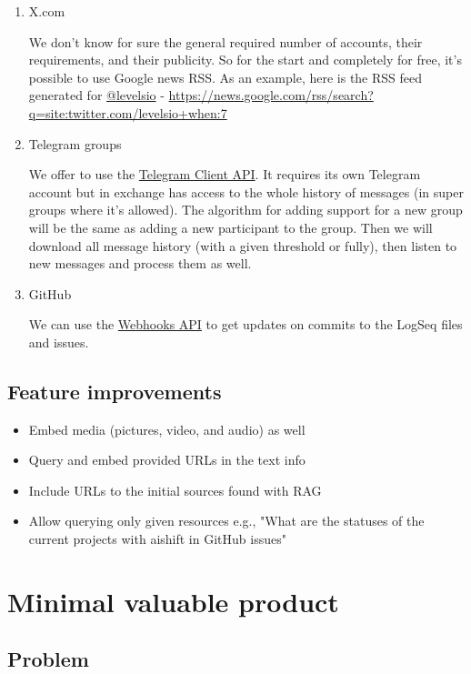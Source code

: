\documentclass[11pt]{article}
\begin{document}
\begin{enumerate}
\begin{enumerate}
\item X.com
\label{sec:org470299b}

We don't know for sure the general required number of accounts, their requirements, and their publicity. So for the start and completely for free, it's possible to use Google news RSS. As an example, here is the RSS feed generated for \href{https://x.com/levelsio}{@levelsio} - \url{https://news.google.com/rss/search?q=site:twitter.com/levelsio+when:7}
\item Telegram groups
\label{sec:orgcea1766}

We offer to use the \href{https://core.telegram.org/\#telegram-api}{Telegram Client API}. It requires its own Telegram account but in exchange has access to the whole history of messages (in super groups where it's allowed). The algorithm for adding support for a new group will be the same as adding a new participant to the group. Then we will download all message history (with a given threshold or fully), then listen to new messages and process them as well.
\item GitHub
\label{sec:orge7859f3}

We can use the \href{https://docs.github.com/en/webhooks/webhook-events-and-payloads}{Webhooks API} to get updates on commits to the LogSeq files and issues.
\end{enumerate}
\end{enumerate}
\subsection{Feature improvements}
\label{sec:orgf2afcc7}

\begin{itemize}
\item Embed media (pictures, video, and audio) as well
\item Query and embed provided URLs in the text info
\item Include URLs to the initial sources found with RAG
\item Allow querying only given resources e.g., "What are the statuses of the current projects with aishift in GitHub issues"
\end{itemize}
\section{Minimal valuable product}
\label{sec:org19d7259}

\subsection{Problem}
\label{sec:org74cfde9}
\end{document}
